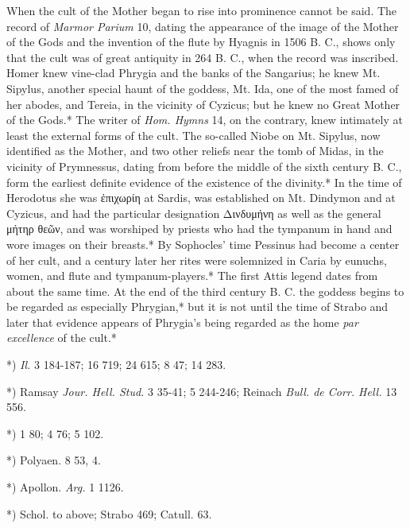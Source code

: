 \documentclass[a4paper, 11pt, oneside, polutonikogreek, english]{article}
\begin{document}
When the cult of the Mother began to rise into prominence cannot be said. The record of \emph{Marmor Parium} 10, dating the appearance of the image of the Mother of the Gods and the invention of the flute by Hyagnis in 1506 B. C., shows only that the cult was of great antiquity in 264 B. C., when the record was inscribed. Homer knew vine-clad Phrygia and the banks of the Sangarius; he knew Mt. Sipylus, another special haunt of the goddess, Mt. Ida, one of the most famed of her abodes, and Tereia, in the vicinity of Cyzicus; but he knew no Great Mother of the Gods.* The writer of \emph{Hom. Hymns} 14, on the contrary, knew intimately at least the external forms of the cult. The so-called Niobe on Mt. Sipylus, now identified as the Mother, and two other reliefs near the tomb of Midas, in the vicinity of Prymnessus, dating from before the middle of the sixth century B. C., form the earliest definite evidence of the existence of the divinity.* In the time of Herodotus she was ἐπιχωρίη at Sardis, was established on Mt. Dindymon and at Cyzicus, and had the particular designation Δινδυμήνη as well as the general μήτηρ θεῶν, and was worshiped by priests who had the tympanum in hand and wore images on their breasts.* By Sophocles' time Pessinus had become a center of her cult, and a century later her rites were solemnized in Caria by eunuchs, women, and flute and tympanum-players.* The first Attis legend dates from about the same time. At the end of the third century B. C. the goddess begins to be regarded as especially Phrygian,* but it is not until the time of Strabo and later that evidence appears of Phrygia's being regarded as the home \emph{par excellence} of the cult.*

*) \emph{Il.} 3 184-187; 16 719; 24 615; 8 47; 14 283.

*) Ramsay \emph{Jour. Hell. Stud.} 3 35-41; 5 244-246; Reinach \emph{Bull. de Corr. Hell.} 13 556.

*) 1 80; 4 76; 5 102.

*) Polyaen. 8 53, 4.

*) Apollon. \emph{Arg.} 1 1126.

*) Schol. to above; Strabo 469; Catull. 63.
\end{document}
